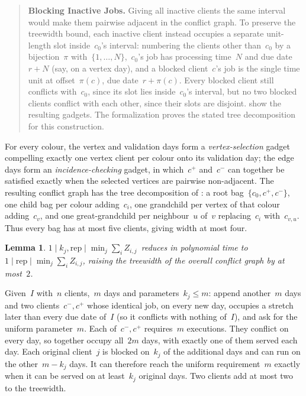 \documentclass[11pt,a4paper]{article}
\newtheorem{lemma}{Lemma}
\theoremstyle{definition}
\newcommand{\threefield}[3]{$#1\mid#2\mid#3$}
\newcommand{\rep}{\mathrm{rep}}
\newcommand{\EQUIJIT}{\threefield{1}{\rep}{\min_j \sum_i Z_{i,j}}}
\newcommand{\WEQUIJIT}{\threefield{1}{k_j,\rep}{\min_j \sum_i Z_{i,j}}}
\begin{document}
\begin{quote}
\textbf{Blocking Inactive Jobs.} Giving all inactive clients the same interval would
make them pairwise adjacent in the conflict graph. To preserve the treewidth bound,
each inactive client instead occupies a separate unit-length slot inside~$c_0$'s interval:
numbering the clients other than~$c_0$ by a
bijection~$\pi$ with~$\{1,\dots,N\}$,~$c_0$'s job has processing time~$N$ and due date~$r+N$
(say, on a vertex day), and a blocked client~$c$'s job is the single time unit at offset~$\pi(c)$, due date~$r+\pi(c)$. Every blocked client still conflicts with~$c_0$, since its slot
lies inside~$c_0$'s interval, but no two blocked clients conflict with each other, since
their slots are disjoint.  show the resulting gadgets.
The formalization proves the stated tree decomposition for this construction.
\end{quote}





For every colour, the vertex and validation days form a \emph{vertex-selection} gadget
compelling exactly one vertex client per colour onto its validation day; the edge days form
an \emph{incidence-checking} gadget, in which~$c^+$ and~$c^-$ can together be satisfied
exactly when the selected vertices are pairwise non-adjacent. The resulting conflict graph
has the tree decomposition of : a root bag~$\{c_0,c^+,c^-\}$, one child
bag per colour adding~$c_i$, one grandchild per vertex of that colour adding~$c_v$, and one
great-grandchild per neighbour~$u$ of~$v$ replacing~$c_i$ with~$c_{v,u}$. Thus every bag has at most five clients, giving width at most four.



\setcounter{lemma}{14}
\begin{lemma}
\label{lem:15}
\WEQUIJIT\ reduces in polynomial time to
\EQUIJIT, raising the treewidth of the overall conflict
graph by at most~$2$.
\end{lemma}
Given~$I$ with~$n$ clients,~$m$ days and parameters~$k_j\le m$: append another~$m$ days and
two clients~$c^-,c^+$ whose identical job, on every new day, occupies a stretch later than
every due date of~$I$ (so it conflicts with nothing of~$I$), and ask for the uniform
parameter~$m$. Each of~$c^-,c^+$ requires~$m$ executions. They conflict on every day, so together
occupy all~$2m$ days, with exactly one of them served each day. Each original client~$j$
is blocked on~$k_j$ of the additional days and can run on the other~$m-k_j$ days.
It can therefore reach the uniform requirement~$m$ exactly when it can be served on
at least~$k_j$ original days. Two
clients add at most two to the treewidth.
\end{document}
